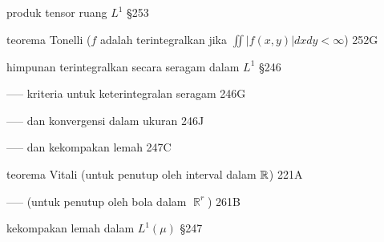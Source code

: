  produk tensor ruang $L^1$ \S253








 teorema Tonelli ($f$ adalah terintegralkan jika $\iint|f(x,y)|dxdy<\infty$) 252G





















\indexmedskip














himpunan terintegralkan secara seragam dalam $L^1$ \S246

----- kriteria untuk keterintegralan seragam 246G



----- dan konvergensi dalam ukuran 246J

----- dan kekompakan lemah 247C









\indexmedskip




 teorema Vitali (untuk penutup oleh interval dalam $\Bbb R$) 221A

----- (untuk penutup oleh bola dalam $\BbbR^r$) 261B





\indexmedskip

 kekompakan lemah dalam $L^1(\mu)$ \S247




















